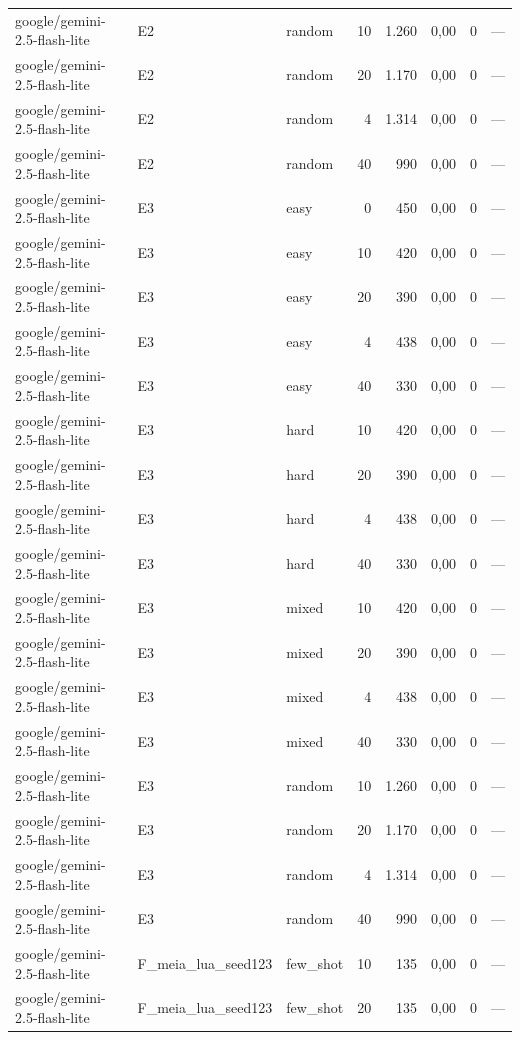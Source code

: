 \begin{table}[htbp]
\begin{tabular}{lllrrrrr}
google/gemini-2.5-flash-lite & E2 & random & 10 & 1.260 & 0,00 & 0 & — \\
google/gemini-2.5-flash-lite & E2 & random & 20 & 1.170 & 0,00 & 0 & — \\
google/gemini-2.5-flash-lite & E2 & random & 4 & 1.314 & 0,00 & 0 & — \\
google/gemini-2.5-flash-lite & E2 & random & 40 & 990 & 0,00 & 0 & — \\
google/gemini-2.5-flash-lite & E3 & easy & 0 & 450 & 0,00 & 0 & — \\
google/gemini-2.5-flash-lite & E3 & easy & 10 & 420 & 0,00 & 0 & — \\
google/gemini-2.5-flash-lite & E3 & easy & 20 & 390 & 0,00 & 0 & — \\
google/gemini-2.5-flash-lite & E3 & easy & 4 & 438 & 0,00 & 0 & — \\
google/gemini-2.5-flash-lite & E3 & easy & 40 & 330 & 0,00 & 0 & — \\
google/gemini-2.5-flash-lite & E3 & hard & 10 & 420 & 0,00 & 0 & — \\
google/gemini-2.5-flash-lite & E3 & hard & 20 & 390 & 0,00 & 0 & — \\
google/gemini-2.5-flash-lite & E3 & hard & 4 & 438 & 0,00 & 0 & — \\
google/gemini-2.5-flash-lite & E3 & hard & 40 & 330 & 0,00 & 0 & — \\
google/gemini-2.5-flash-lite & E3 & mixed & 10 & 420 & 0,00 & 0 & — \\
google/gemini-2.5-flash-lite & E3 & mixed & 20 & 390 & 0,00 & 0 & — \\
google/gemini-2.5-flash-lite & E3 & mixed & 4 & 438 & 0,00 & 0 & — \\
google/gemini-2.5-flash-lite & E3 & mixed & 40 & 330 & 0,00 & 0 & — \\
google/gemini-2.5-flash-lite & E3 & random & 10 & 1.260 & 0,00 & 0 & — \\
google/gemini-2.5-flash-lite & E3 & random & 20 & 1.170 & 0,00 & 0 & — \\
google/gemini-2.5-flash-lite & E3 & random & 4 & 1.314 & 0,00 & 0 & — \\
google/gemini-2.5-flash-lite & E3 & random & 40 & 990 & 0,00 & 0 & — \\
google/gemini-2.5-flash-lite & F\_meia\_lua\_seed123 & few\_shot & 10 & 135 & 0,00 & 0 & — \\
google/gemini-2.5-flash-lite & F\_meia\_lua\_seed123 & few\_shot & 20 & 135 & 0,00 & 0 & — \\

\end{tabular}
\end{table}
